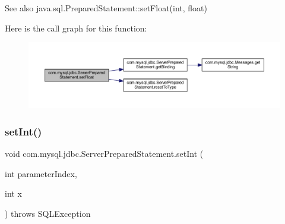 \begin{DoxySeeAlso}{See also}
java.\+sql.\+Prepared\+Statement\+::set\+Float(int, float) 
\end{DoxySeeAlso}
Here is the call graph for this function\+:
\nopagebreak
\begin{figure}[H]
\begin{center}
\leavevmode
\includegraphics[width=350pt]{classcom_1_1mysql_1_1jdbc_1_1_server_prepared_statement_ac1a444b7637bc226a3af13e86302dbe8_cgraph}
\end{center}
\end{figure}
\mbox{\label{classcom_1_1mysql_1_1jdbc_1_1_server_prepared_statement_ae069199763eb91fc92b7db6c7ff583db}} 
\subsubsection{\texorpdfstring{set\+Int()}{setInt()}}
{\footnotesize\ttfamily void com.\+mysql.\+jdbc.\+Server\+Prepared\+Statement.\+set\+Int (\begin{DoxyParamCaption}\item[{int}]{parameter\+Index,  }\item[{int}]{x }\end{DoxyParamCaption}) throws S\+Q\+L\+Exception}


